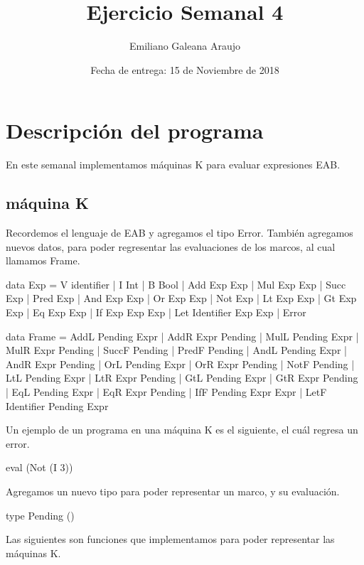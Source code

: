 \documentclass[spanish,12pt,letterpaper]{article}
\title{Ejercicio Semanal 4}
\author{Emiliano Galeana Araujo}
\affil{Facultad de Ciencias, UNAM}
\date{Fecha de entrega: 15 de Noviembre de 2018}
\begin{document}
\maketitle

\section{Descripción del programa}
En este semanal implementamos máquinas K para evaluar expresiones EAB.
\subsection{máquina K}
Recordemos el lenguaje de EAB y agregamos el tipo Error. También agregamos
nuevos datos, para poder regresentar las evaluaciones de los marcos, al cual
llamamos Frame.
\begin{code}
  data Exp = V identifier | I Int | B Bool
    | Add Exp Exp | Mul Exp Exp | Succ Exp | Pred Exp 
    | And Exp Exp | Or Exp Exp  | Not Exp
    | Lt Exp Exp  | Gt Exp Exp  | Eq Exp Exp
    | If Exp Exp Exp
    | Let Identifier Exp Exp
    | Error

  data Frame = AddL Pending Expr
           | AddR Expr Pending
           | MulL Pending Expr
           | MulR Expr Pending
           | SuccF Pending
           | PredF Pending
           | AndL Pending Expr
           | AndR Expr Pending
           | OrL Pending Expr
           | OrR Expr Pending
           | NotF Pending
           | LtL Pending Expr
           | LtR Expr Pending
           | GtL Pending Expr
           | GtR Expr Pending
           | EqL Pending Expr
           | EqR Expr Pending
           | IfF Pending Expr Expr
           | LetF Identifier Pending Expr
\end{code}
Un ejemplo de un programa en una máquina K es el siguiente, el cuál regresa un
error.
\begin{code}
  eval (Not (I 3))
\end{code}

Agregamos un nuevo tipo para poder representar un marco, y su evaluación.

\begin{code}
   type Pending ()
\end{code}

Las siguientes son funciones que implementamos para poder representar las
máquinas K.
\end{document}
